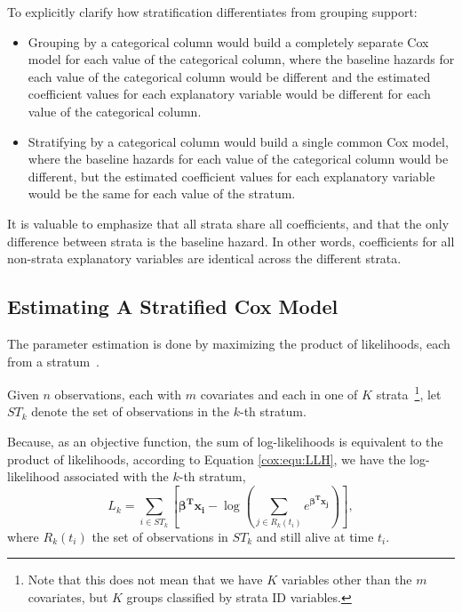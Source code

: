 To explicitly clarify how stratification differentiates from grouping support:
\begin{itemize}
    \item Grouping by a categorical column would build a completely separate
    Cox model for each value of the categorical column, where the baseline
    hazards for each value of the categorical column would be different and
    the estimated coefficient values for each explanatory variable would be
    different for each value of the categorical column.
    \item Stratifying by a categorical column would build a single
    common Cox model, where the baseline hazards for each value of the
    categorical column would be different, but the estimated coefficient values
    for each explanatory variable would be the same for each value of the stratum.
\end{itemize}

It is valuable to emphasize that all strata share all coefficients, and that the
only difference between strata is the baseline hazard.  In other words,
coefficients for all non-strata explanatory variables are identical across the
different strata.

\subsection{Estimating A Stratified Cox Model}\label{cox:estimate-stratified}
The parameter estimation is done by maximizing the product of likelihoods, each
from a stratum~\cite{stratifiedethzslides}.

Given $n$ observations, each with $m$ covariates and each in one of $K$
strata~\footnote{Note that this does not mean that we have $K$ variables other
than the $m$ covariates, but $K$ groups classified by strata ID variables.}, let
$\mathit{ST}_{k}$ denote the set of observations in the $k$-th stratum.

Because, as an objective function, the sum of log-likelihoods is equivalent to
the product of likelihoods, according to Equation \ref{cox:equ:LLH}, we have the
log-likelihood associated with the $k$-th stratum,
\begin{equation}\label{cox:equ:obj-each-stratum}L_{k} = \sum_{i \in \mathit{ST}_{k}} \left[  \mathbf{\beta^T x_i} - \log\left(\sum_{j \in R_k(t_i)} e^{\mathbf{\beta^T x_j} } \right) \right],
\end{equation}
where $R_k(t_i)$ the set of observations in $\mathit{ST}_{k}$ and still alive at time $t_i$.

